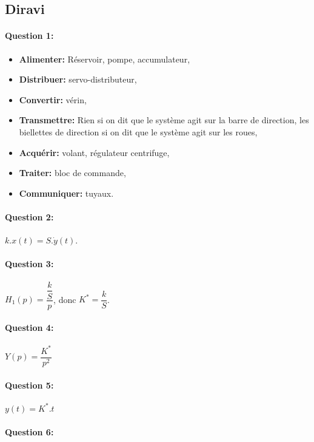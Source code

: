 \subsection{Diravi}

\paragraph{Question 1:}

\begin{itemize}
 \item \textbf{Alimenter:} Réservoir, pompe, accumulateur,
 \item \textbf{Distribuer:} servo-distributeur,
 \item \textbf{Convertir:} vérin,
 \item \textbf{Transmettre:} Rien si on dit que le système agit sur la barre de direction, les biellettes de direction si on dit que le système agit sur les roues,
 \item \textbf{Acquérir:} volant, régulateur centrifuge,
 \item \textbf{Traiter:} bloc de commande,
 \item \textbf{Communiquer:} tuyaux.
\end{itemize}

\paragraph{Question 2:}

$k.x(t)=S.\dot{y}(t)$.

\paragraph{Question 3:}

$H_1(p)=\dfrac{\dfrac{k}{S}}{p}$, donc $K^*=\dfrac{k}{S}$.

\paragraph{Question 4:}

$Y(p)=\dfrac{K^*}{p^2}$

\paragraph{Question 5:}

$y(t)=K^*.t$

\paragraph{Question 6:}

